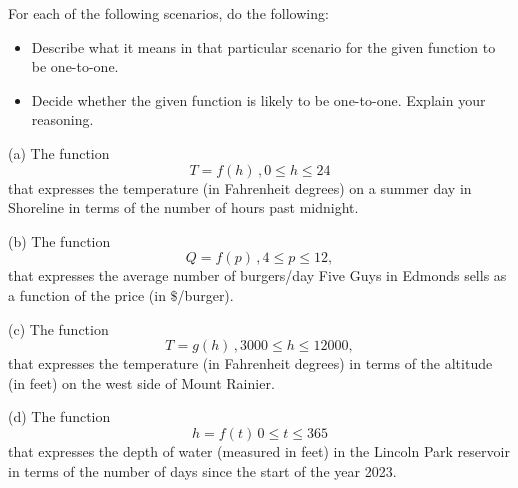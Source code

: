 \documentclass{ximera}
\begin{document}
\begin{exercise}   \label{Ex:LKdjfgd}
For each of the following scenarios, do the following:

\begin{itemize}
\item{Describe what it means in that particular scenario for the given function to be one-to-one.}

\item{Decide whether the given function is likely to be one-to-one. Explain your reasoning.}
\end{itemize}

(a) The function 
\[
     T = f(h)  \, , 0\leq h \leq 24
\]
that expresses the temperature (in Fahrenheit degrees) on a summer day in Shoreline in terms of the number of hours past midnight.

(b) The function
\[
     Q = f(p) \, , 4\leq p \leq 12 ,
\]
that expresses the average number of burgers/day Five Guys in Edmonds sells as a function of the price (in $\$$/burger).

(c) The function
\[
     T = g(h) \, , 3000\leq h \leq 12000 ,
\]
that expresses the temperature (in Fahrenheit degrees) in terms of the altitude (in feet) on the west side of Mount Rainier.

(d) The function 
\[
   h = f(t) \, 0\leq t \leq 365
\]
that expresses the depth of water (measured in feet) in the Lincoln Park reservoir in terms of the number of days since the start of the year 2023. 

\end{exercise}
\end{document}
